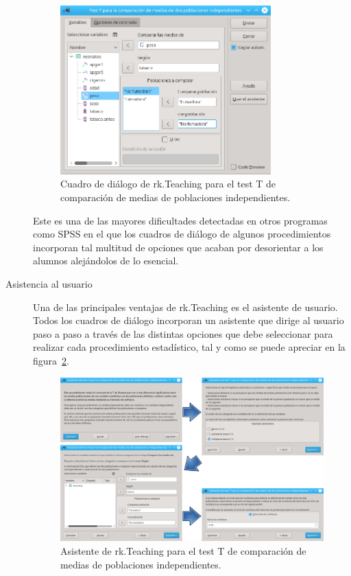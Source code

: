 \documentclass[a4paper,10pt,twoside]{article}
\newcommand{\rkteaching}{\textsf{rk.Teaching}}
\newcommand{\spss}{\textsf{SPSS}}
\begin{document}
\begin{description}
\begin{figure}[htbp!]
\centering
\includegraphics[width=0.8\textwidth]{img/dialogo_test_t.png}
\caption{Cuadro de diálogo de \rkteaching{} para el test T de comparación de medias de poblaciones independientes.}
\label{f:dialogo-test-t}
\end{figure}

Este es una de las mayores dificultades detectadas en otros programas como \spss{} en el que los
cuadros de diálogo de algunos procedimientos incorporan tal multitud de opciones que acaban por desorientar a los
alumnos alejándolos de lo esencial.


\item[Asistencia al usuario] Una de las principales ventajas de \rkteaching{} es el asistente de usuario. 
Todos los cuadros de diálogo incorporan un asistente que dirige al usuario paso a paso a través de las
distintas opciones que debe seleccionar para realizar cada procedimiento estadístico, tal y como se puede apreciar en la
figura~\ref{f:asistente-test-t}.

\begin{figure}[htbp!]
\centering
\includegraphics[width=\textwidth]{img/asistente_test_t.png}
\caption{Asistente de \rkteaching{} para el test T de comparación de medias de poblaciones independientes.}
\label{f:asistente-test-t}
\end{figure}


\end{description}
\end{document}
